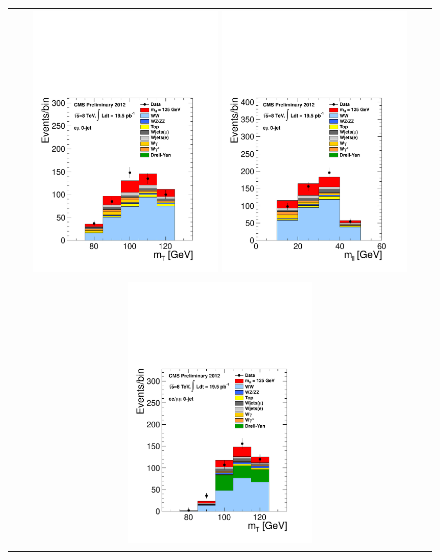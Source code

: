 \begin{figure}[htp] 
\centering 
\begin{tabular}{c} 
\includegraphics[width=0.45\textwidth]{figures/hww_analysis17_125_ALL_of_0j_mt.pdf}
\includegraphics[width=0.45\textwidth]{figures/hww_analysis17_125_ALL_of_0j_mll.pdf} 
\\
\includegraphics[width=0.45\textwidth]{figures/hww_analysis17_125_ALL_sf_0j_mt.pdf}

\end{tabular}
\end{figure}
